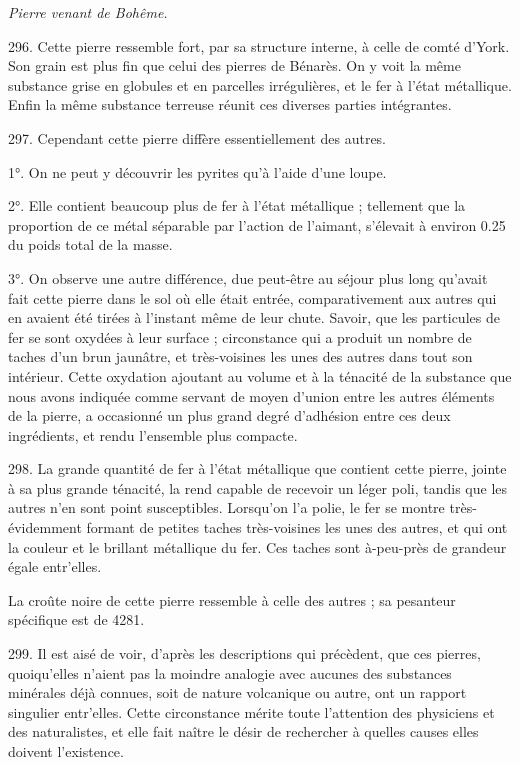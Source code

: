 \documentclass[a4paper, 11pt, oneside, polutonikogreek, french]{article}
\begin{document}
\begin{center}
\emph{Pierre venant de Bohême.}
\end{center}

296. Cette pierre ressemble fort, par sa structure interne, à celle de comté d'York. Son grain est plus fin que celui des pierres de Bénarès. On y voit la même substance grise en globules et en parcelles irrégulières, et le fer à l'état métallique. Enfin la même substance terreuse réunit ces diverses parties intégrantes.

297. Cependant cette pierre diffère essentiellement des autres.

1°. On ne peut y découvrir les pyrites qu'à l'aide d'une loupe.

2°. Elle contient beaucoup plus de fer à l'état métallique ; tellement que la proportion de ce métal séparable par l'action de l'aimant, s'élevait à environ 0.25 du poids total de la masse.

3°. On observe une autre différence, due peut-être au séjour plus long qu'avait fait cette pierre dans le sol où elle était entrée, comparativement aux autres qui en avaient été tirées à l'instant même de leur chute. Savoir, que les particules de fer se sont oxydées à leur surface ; circonstance qui a produit un nombre de taches d'un brun jaunâtre, et très-voisines les unes des autres dans tout son intérieur. Cette oxydation ajoutant au volume et à la ténacité de la substance que nous avons indiquée comme servant de moyen d'union entre les autres éléments de la pierre, a occasionné un plus grand degré d'adhésion entre ces deux ingrédients, et rendu l'ensemble plus compacte.

298. La grande quantité de fer à l'état métallique que contient cette pierre, jointe à sa plus grande ténacité, la rend capable de recevoir un léger poli, tandis que les autres n'en sont point susceptibles. Lorsqu'on l'a polie, le fer se montre très-évidemment formant de petites taches très-voisines les unes des autres, et qui ont la couleur et le brillant métallique du fer. Ces taches sont à-peu-près de grandeur égale entr'elles.

La croûte noire de cette pierre ressemble à celle des autres ; sa pesanteur spécifique est de 4281.

299. Il est aisé de voir, d'après les descriptions qui précèdent, que ces pierres, quoiqu'elles n'aient pas la moindre analogie avec aucunes des substances minérales déjà connues, soit de nature volcanique ou autre, ont un rapport singulier entr'elles. Cette circonstance mérite toute l'attention des physiciens et des naturalistes, et elle fait naître le désir de rechercher à quelles causes elles doivent l'existence.
\end{document}
